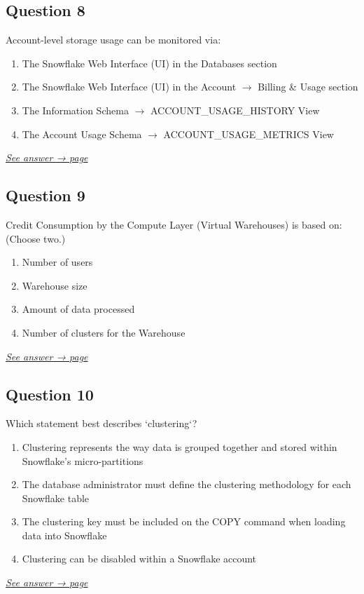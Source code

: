 \documentclass[12pt]{article}
\newcommand{\seeanswer}[1]{%
  \par\smallskip\emph{\hyperref[ans:#1]{See answer → page \pageref{ans:#1}}}%
}
\begin{document}
\subsection*{Question 8}\label{q:8}
Account-level storage usage can be monitored via:

\begin{enumerate}[label=\Alph*.]
  \item The Snowflake Web Interface (UI) in the Databases section
  \item The Snowflake Web Interface (UI) in the Account $\rightarrow$ Billing \& Usage section
  \item The Information Schema $\rightarrow$ ACCOUNT\_USAGE\_HISTORY View
  \item The Account Usage Schema $\rightarrow$ ACCOUNT\_USAGE\_METRICS View
\end{enumerate}
\seeanswer{8}

\subsection*{Question 9}\label{q:9}
Credit Consumption by the Compute Layer (Virtual Warehouses) is based on: (Choose two.)

\begin{enumerate}[label=\Alph*.]
  \item Number of users
  \item Warehouse size
  \item Amount of data processed
  \item Number of clusters for the Warehouse
\end{enumerate}
\seeanswer{9}

\subsection*{Question 10}\label{q:10}
Which statement best describes `clustering`?

\begin{enumerate}[label=\Alph*.]
  \item Clustering represents the way data is grouped together and stored within Snowflake's micro-partitions
  \item The database administrator must define the clustering methodology for each Snowflake table
  \item The clustering key must be included on the COPY command when loading data into Snowflake
  \item Clustering can be disabled within a Snowflake account
\end{enumerate}
\seeanswer{10}
\end{document}
